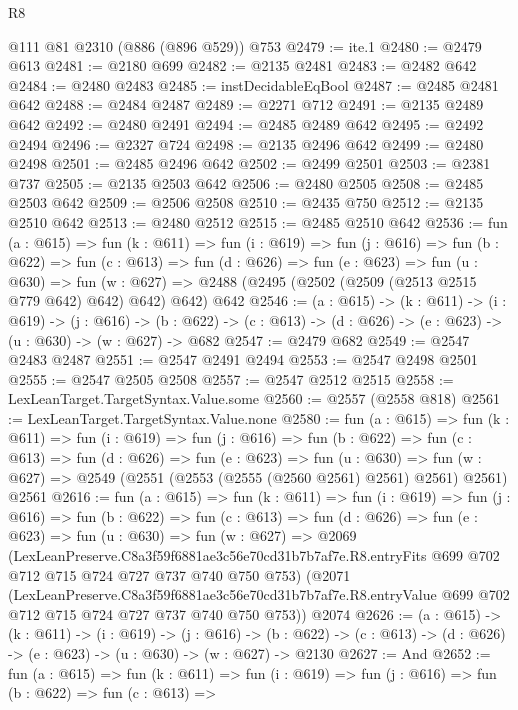 \begin{lexlean}{R8}
\begin{coremodule}
    @111
    @81
    @2310
    (@886 (@896 @529))
    @753
@2479 := ite.{1}
@2480 := @2479 @613
@2481 := @2180 @699
@2482 := @2135 @2481
@2483 := @2482 @642
@2484 := @2480 @2483
@2485 := instDecidableEqBool
@2487 := @2485 @2481 @642
@2488 := @2484 @2487
@2489 := @2271 @712
@2491 := @2135 @2489 @642
@2492 := @2480 @2491
@2494 := @2485 @2489 @642
@2495 := @2492 @2494
@2496 := @2327 @724
@2498 := @2135 @2496 @642
@2499 := @2480 @2498
@2501 := @2485 @2496 @642
@2502 := @2499 @2501
@2503 := @2381 @737
@2505 := @2135 @2503 @642
@2506 := @2480 @2505
@2508 := @2485 @2503 @642
@2509 := @2506 @2508
@2510 := @2435 @750
@2512 := @2135 @2510 @642
@2513 := @2480 @2512
@2515 := @2485 @2510 @642
@2536 := fun (a : @615) =>
  fun (k : @611) =>
  fun (i : @619) =>
  fun (j : @616) =>
  fun (b : @622) =>
  fun (c : @613) =>
  fun (d : @626) =>
  fun (e : @623) =>
  fun (u : @630) =>
  fun (w : @627) => @2488 (@2495 (@2502 (@2509 (@2513 @2515 @779 @642) @642) @642) @642) @642
@2546 := (a : @615) ->
  (k : @611) ->
  (i : @619) ->
  (j : @616) ->
  (b : @622) -> (c : @613) -> (d : @626) -> (e : @623) -> (u : @630) -> (w : @627) -> @682
@2547 := @2479 @682
@2549 := @2547 @2483 @2487
@2551 := @2547 @2491 @2494
@2553 := @2547 @2498 @2501
@2555 := @2547 @2505 @2508
@2557 := @2547 @2512 @2515
@2558 := LexLeanTarget.TargetSyntax.Value.some
@2560 := @2557 (@2558 @818)
@2561 := LexLeanTarget.TargetSyntax.Value.none
@2580 := fun (a : @615) =>
  fun (k : @611) =>
  fun (i : @619) =>
  fun (j : @616) =>
  fun (b : @622) =>
  fun (c : @613) =>
  fun (d : @626) =>
  fun (e : @623) =>
  fun (u : @630) =>
  fun (w : @627) => @2549 (@2551 (@2553 (@2555 (@2560 @2561) @2561) @2561) @2561) @2561
@2616 := fun (a : @615) =>
  fun (k : @611) =>
  fun (i : @619) =>
  fun (j : @616) =>
  fun (b : @622) =>
  fun (c : @613) =>
  fun (d : @626) =>
  fun (e : @623) =>
  fun (u : @630) =>
  fun (w : @627) =>
  @2069
    (LexLeanPreserve.C8a3f59f6881ae3c56e70cd31b7b7af7e.R8.entryFits
      @699
      @702
      @712
      @715
      @724
      @727
      @737
      @740
      @750
      @753)
    (@2071
      (LexLeanPreserve.C8a3f59f6881ae3c56e70cd31b7b7af7e.R8.entryValue
        @699
        @702
        @712
        @715
        @724
        @727
        @737
        @740
        @750
        @753))
    @2074
@2626 := (a : @615) ->
  (k : @611) ->
  (i : @619) ->
  (j : @616) ->
  (b : @622) -> (c : @613) -> (d : @626) -> (e : @623) -> (u : @630) -> (w : @627) -> @2130
@2627 := And
@2652 := fun (a : @615) =>
  fun (k : @611) =>
  fun (i : @619) =>
  fun (j : @616) =>
  fun (b : @622) =>
  fun (c : @613) =>

\end{coremodule}
\end{lexlean}
